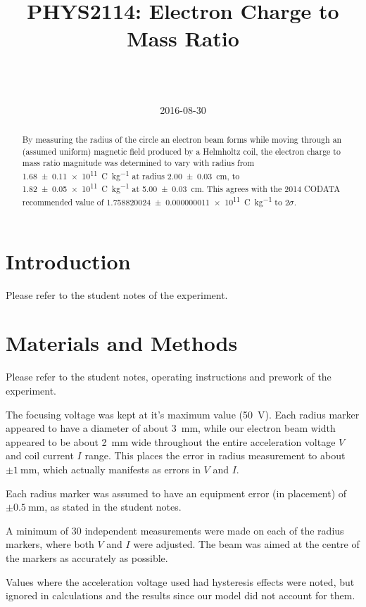 \documentclass[a4paper]{scrartcl}
\begin{document}
\title{PHYS2114: Electron Charge to Mass Ratio}
\author{ \\ \\ }
\date{2016-08-30}
\maketitle

\begin{abstract}
    By measuring the radius of the circle an electron beam forms while moving through an (assumed uniform) magnetic field produced by a Helmholtz coil, the electron charge to mass ratio magnitude was determined to vary with radius from \SI{1.68 \pm 0.11e11}{\coulomb\per\kilo\gram} at radius \SI{2.00 \pm 0.03}{\centi\metre}, to \SI{1.82 \pm 0.05e11}{\coulomb\per\kilo\gram} at \SI{5.00 \pm 0.03}{\centi\metre}. This agrees with the 2014 CODATA recommended value of \SI{1.758820024 \pm 0.000000011e11}{\coulomb\per\kilo\gram} to \(2 \sigma\).
\end{abstract}

\section{Introduction}
Please refer to the student notes of the experiment.

\section{Materials and Methods}
Please refer to the student notes, operating instructions and prework of the experiment.

The focusing voltage was kept at it's maximum value (\SI{50}{\volt}). Each radius marker appeared to have a diameter of about \SI{3}{\milli\metre}, while our electron beam width appeared to be about \SI{2}{\milli\metre} wide throughout the entire acceleration voltage \(V\) and coil current \(I\) range. This places the error in radius measurement to about \(\pm\SI{1}{\milli\metre}\), which actually manifests as errors in \(V\) and \(I\).

Each radius marker was assumed to have an equipment error (in placement) of \(\pm\SI{0.5}{\milli\metre}\), as stated in the student notes.

A minimum of 30 independent measurements were made on each of the radius markers, where both \(V\) and \(I\) were adjusted. The beam was aimed at the centre of the markers as accurately as possible.

Values where the acceleration voltage used had hysteresis effects were noted, but ignored in calculations and the results since our model did not account for them.
\end{document}
